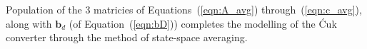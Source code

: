 Population of the 3 matricies of Equations~(\ref{eqn:A_avg}) through~(\ref{eqn:c_avg}), along with $\boldsymbol{b}_d$ (of Equation~(\ref{eqn:bD})) completes the modelling of the \'{C}uk converter through the method of state-space averaging.